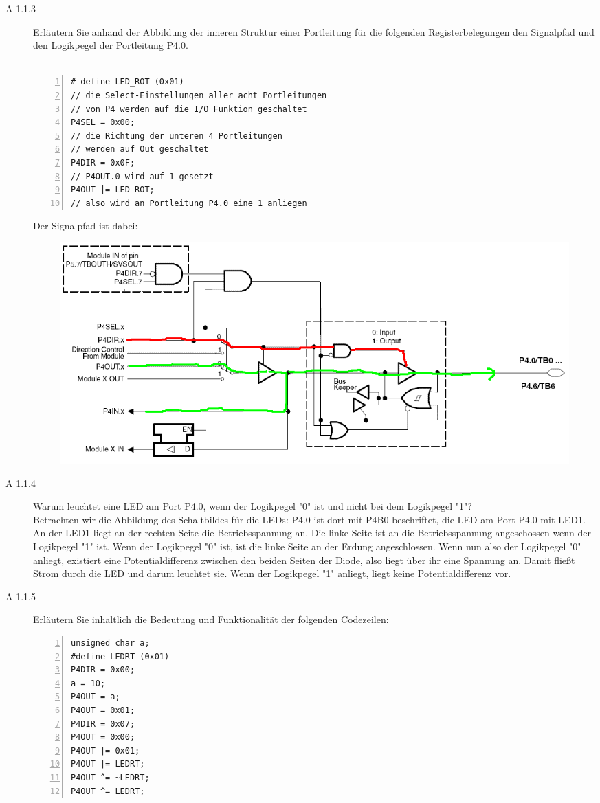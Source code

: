 \documentclass[11pt,a4paper,ngerman]{article}
\begin{document}
\begin{description}
	\newpage
	\item[A 1.1.3] Erläutern Sie anhand der Abbildung der inneren Struktur einer Portleitung für die folgenden Registerbelegungen den Signalpfad und den Logikpegel der Portleitung P4.0. \\ \\
		\begin{lstlisting}[numbers=left]
# define LED_ROT (0x01)
// die Select-Einstellungen aller acht Portleitungen
// von P4 werden auf die I/O Funktion geschaltet
P4SEL = 0x00;
// die Richtung der unteren 4 Portleitungen 
// werden auf Out geschaltet
P4DIR = 0x0F;
// P4OUT.0 wird auf 1 gesetzt
P4OUT |= LED_ROT;
// also wird an Portleitung P4.0 eine 1 anliegen
		\end{lstlisting}
		
		Der Signalpfad ist dabei:
		\begin{figure}[h!]
			\includegraphics[scale=0.3]{0401011.png}
		\end{figure}	
	\item[A 1.1.4] Warum leuchtet eine LED am Port P4.0, wenn der Logikpegel "0" ist und nicht bei dem Logikpegel "1"? \\
	
		Betrachten wir die Abbildung des Schaltbildes für die LEDs: P4.0 ist dort mit P4B0 beschriftet, die LED am Port P4.0 mit LED1. An der LED1 liegt an der rechten Seite die Betriebsspannung an. Die linke Seite ist an die Betriebsspannung angeschossen	wenn der Logikpegel "1" ist. Wenn der Logikpegel "0" ist, ist die linke Seite an der Erdung angeschlossen. Wenn nun also der Logikpegel "0" anliegt, existiert eine Potentialdifferenz zwischen den beiden Seiten der Diode, also liegt über ihr eine Spannung an. Damit fließt Strom durch die LED und darum leuchtet sie. Wenn der Logikpegel "1" anliegt, liegt keine
	Potentialdifferenz vor.


	\item[A 1.1.5] Erläutern Sie inhaltlich die Bedeutung und Funktionalität der folgenden Codezeilen: \\
		\begin{lstlisting}[numbers=left]
unsigned char a;
#define LEDRT (0x01)
P4DIR = 0x00;
a = 10;
P4OUT = a;
P4OUT = 0x01;
P4DIR = 0x07;
P4OUT = 0x00;
P4OUT |= 0x01;
P4OUT |= LEDRT;
P4OUT ^= ~LEDRT;
P4OUT ^= LEDRT;
		\end{lstlisting}
		

\end{description}
\end{document}
